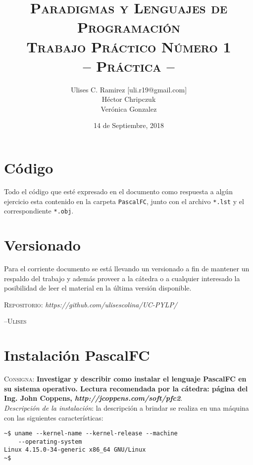 \documentclass{article}
\title{\textsc{Paradigmas y Lenguajes de Programaci\'on\\Trabajo Pr\'actico N\'umero 1\\-- Pr\'actica --}}
\author{Ulises C. Ramirez [uli.r19@gmail.com]\\H\'ector Chripczuk\\Ver\'onica Gonzalez}
\date{14 de Septiembre, 2018}
\begin{document}
\maketitle
{}
\newpage

\section*{C\'odigo}
Todo el c\'odigo que est\'e expresado en el documento como respuesta a alg\'un ejercicio esta contenido en la carpeta \texttt{PascalFC}, junto con el archivo \texttt{*.lst} y el correspondiente \texttt{*.obj}.\\

\section*{Versionado}
Para el corriente documento se est\'a llevando un versionado a fin de mantener un respaldo del trabajo y adem\'as proveer a la c\'atedra o a cualquier interesado la posibilidad de leer el material en la \'ultima versi\'on disponible.\\

\begin{center}
  \textsc{Repositorio}: \textit{https://github.com/ulisescolina/UC-PYLP/}
\end{center}

\hfill--\textsc{Ulises}
\tableofcontents
{}
\newpage

\section{Instalaci\'on PascalFC}
\label{sec:pascalfc}
\textsc{Consigna}: \textbf{Investigar y describir como instalar el lenguaje PascalFC en su sistema operativo. Lectura recomendada por la c\'atedra: p\'agina del Ing. John Coppens, \textit{http://jcoppens.com/soft/pfc2}}.\\

\textit{Descripci\'on de la instalaci\'on}: la descripci\'on a brindar se realiza en una m\'aquina con las siguientes caracter\'isticas:\\

\begin{lstlisting}[caption={Caracter\'isticas sistema}]
~$ uname --kernel-name --kernel-release --machine
    --operating-system
Linux 4.15.0-34-generic x86_64 GNU/Linux
~$
\end{lstlisting}
\end{document}
